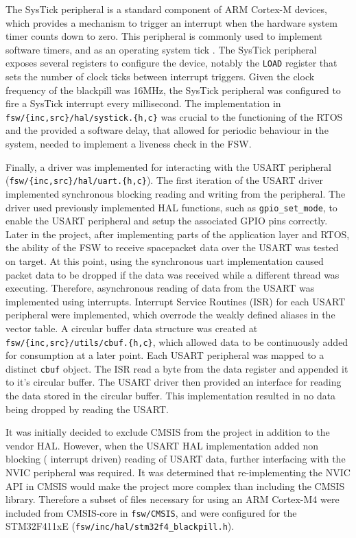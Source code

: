 \documentclass[../report.tex]{subfiles}
\begin{document}
The SysTick peripheral is a standard component of ARM Cortex-M devices, which
provides a mechanism to trigger an interrupt when the hardware system timer
counts down to zero. This peripheral is commonly used to implement software
timers, and as an operating system tick \citep{armcm4_manual}. The SysTick
peripheral exposes several registers to configure the device, notably the
\lstinline|LOAD| register that sets the number of clock ticks between interrupt
triggers. Given the clock frequency of the blackpill was 16MHz, the SysTick
peripheral was configured to fire a SysTick interrupt every millisecond. The
implementation in \lstinline|fsw/{inc,src}/hal/systick.{h,c}| was crucial to the
functioning of the RTOS and the provided a software delay, that allowed for
periodic behaviour in the system, needed to implement a liveness check in the
FSW.

Finally, a driver was implemented for interacting with the USART peripheral
(\lstinline|fsw/{inc,src}/hal/uart.{h,c}|). The first iteration of the USART
driver implemented synchronous blocking reading and writing from the
peripheral. The driver used previously implemented HAL functions, such as
\lstinline|gpio_set_mode|, to enable the USART peripheral and setup the
associated GPIO pins correctly. Later in the project, after implementing parts
of the application layer and RTOS, the ability of the FSW to receive
spacepacket data over the USART was tested on target. At this point, using the
synchronous uart implementation caused packet data to be dropped if the data was
received while a different thread was executing. Therefore, asynchronous
reading of data from the USART was implemented using interrupts. Interrupt
Service Routines (ISR) for each USART peripheral were implemented, which
overrode the weakly defined aliases in the vector table. A circular buffer
data structure was created at \lstinline|fsw/{inc,src}/utils/cbuf.{h,c}|, which
allowed data to be continuously added for consumption at a later point. Each
USART peripheral was mapped to a distinct \lstinline|cbuf| object. The ISR read
a byte from the data register and appended it to it's circular buffer. The
USART driver then provided an interface for reading the data stored in the
circular buffer. This implementation resulted in no data being dropped by
reading the USART.

It was initially decided to exclude CMSIS from the project in addition to the
vendor HAL. However, when the USART HAL implementation added non blocking (
interrupt driven) reading of USART data, further interfacing with the NVIC
peripheral was required. It was determined that re-implementing the NVIC API in
CMSIS would make the project more complex than including the CMSIS library.
Therefore a subset of files necessary for using an ARM Cortex-M4 were included
from CMSIS-core \citep{CMSIS} in \lstinline|fsw/CMSIS|, and were configured for
the STM32F411xE (\lstinline|fsw/inc/hal/stm32f4_blackpill.h|).
\end{document}

